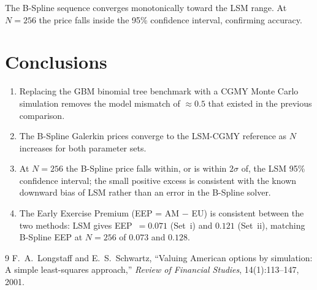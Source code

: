 \documentclass[11pt,a4paper]{article}
\begin{document}
\noindent The B-Spline sequence converges monotonically toward the LSM range.
At $N=256$ the price falls inside the 95\% confidence interval, confirming
accuracy.

\section{Conclusions}

\begin{enumerate}
  \item Replacing the GBM binomial tree benchmark with a CGMY Monte Carlo
    simulation removes the model mismatch of $\approx 0.5$ that existed in the
    previous comparison.
  \item The B-Spline Galerkin prices converge to the LSM-CGMY reference as $N$
    increases for both parameter sets.
  \item At $N = 256$ the B-Spline price falls within, or is within $2\sigma$
    of, the LSM 95\% confidence interval; the small positive excess is
    consistent with the known downward bias of LSM rather than an error in
    the B-Spline solver.
  \item The Early Exercise Premium (EEP = AM $-$ EU) is consistent between the
    two methods: LSM gives EEP~$=0.071$ (Set~i) and $0.121$ (Set~ii),
    matching B-Spline EEP at $N=256$ of $0.073$ and $0.128$.
\end{enumerate}

\begin{thebibliography}{9}
  F.~A.~Longstaff and E.~S.~Schwartz,
  ``Valuing American options by simulation: A simple least-squares approach,''
  \textit{Review of Financial Studies}, 14(1):113--147, 2001.
\end{thebibliography}
\end{document}
